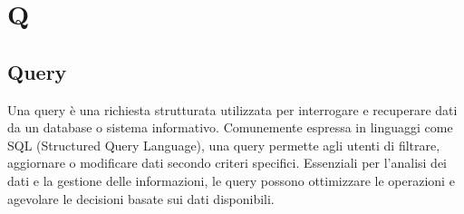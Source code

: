 \section{Q}
\vspace{2em}
\subsection*{Query}
\par Una query è una richiesta strutturata utilizzata per interrogare e recuperare dati da un database o sistema informativo. Comunemente espressa in linguaggi come SQL (Structured Query Language), una query permette agli utenti di filtrare, aggiornare o modificare dati secondo criteri specifici. Essenziali per l'analisi dei dati e la gestione delle informazioni, le query possono ottimizzare le operazioni e agevolare le decisioni basate sui dati disponibili.
